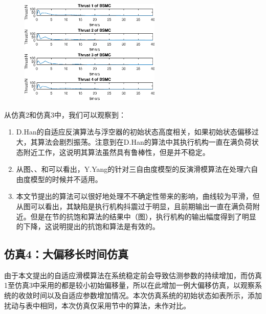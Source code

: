 \begin{figure}[!htp]
    \centering
    \includegraphics[width=0.6\textwidth,clip]{figure/chap03/case2-inputBSMC.eps}
\end{figure}

从仿真2和仿真3中，我们可以观察到：
\begin{enumerate}
    \item D.Han的自适应反演算法与浮空器的初始状态高度相关，如果初始状态偏移过大，其算法会剧烈振荡。注意到在D.Han的算法中其执行机构一直在满负荷状态附近工作，这说明其算法虽然具有鲁棒性，但是并不稳定。
    \item 从图、、和可以看出，Y.Yang的针对三自由度模型的反演滑模算法在处理六自由度模型的时候并不适用。
    \item 本文节提出的算法可以很好地处理不不确定性带来的影响，曲线较为平滑，但从图可以看出，其缺陷是执行机构抖震过于明显，且前期输出一直在满负荷附近。但是在节的抗饱和算法的结果中（图），执行机构的输出幅度得到了明显的下降，这说明提出的抗饱和算法是有效的。
\end{enumerate}

\subsection{仿真4：大偏移长时间仿真}\label{sec:sim3-4}
由于本文提出的自适应滑模算法在系统稳定前会导致估测参数的持续增加，而仿真1至仿真3中采用的都是较小初始偏移量，所以在此增加一例大偏移仿真，以观察系统的收敛时间以及自适应参数增加情况。本次仿真系统的初始状态如表所示，添加扰动与表中相同，本次仿真仅采用节中的算法，未作对比。

